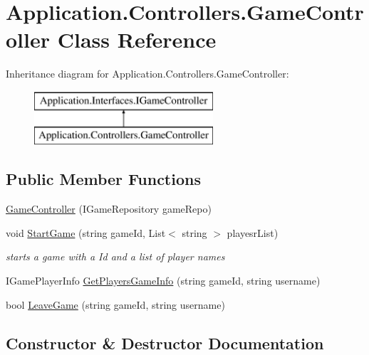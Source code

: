 \hypertarget{class_application_1_1_controllers_1_1_game_controller}{}\section{Application.\+Controllers.\+Game\+Controller Class Reference}
\label{class_application_1_1_controllers_1_1_game_controller}
Inheritance diagram for Application.\+Controllers.\+Game\+Controller\+:\begin{figure}[H]
\begin{center}
\leavevmode
\includegraphics[height=2.000000cm]{class_application_1_1_controllers_1_1_game_controller}
\end{center}
\end{figure}
\subsection*{Public Member Functions}
\begin{DoxyCompactItemize}
\item 
\mbox{\hyperlink{class_application_1_1_controllers_1_1_game_controller_a0576d983a11c3d8f276314ebacece291}{Game\+Controller}} (I\+Game\+Repository game\+Repo)
\item 
void \mbox{\hyperlink{class_application_1_1_controllers_1_1_game_controller_aca897a6c639e043db85b41049d550cf2}{Start\+Game}} (string game\+Id, List$<$ string $>$ playesr\+List)
\begin{DoxyCompactList}\small\item\em starts a game with a Id and a list of player names \end{DoxyCompactList}\item 
I\+Game\+Player\+Info \mbox{\hyperlink{class_application_1_1_controllers_1_1_game_controller_aa0d0e2d74e14771144c1923c77186bb2}{Get\+Players\+Game\+Info}} (string game\+Id, string username)
\item 
bool \mbox{\hyperlink{class_application_1_1_controllers_1_1_game_controller_a5ed6117775253438a76aadcacd44a984}{Leave\+Game}} (string game\+Id, string username)
\end{DoxyCompactItemize}


\subsection{Constructor \& Destructor Documentation}
\mbox{\label{class_application_1_1_controllers_1_1_game_controller_a0576d983a11c3d8f276314ebacece291}} 
